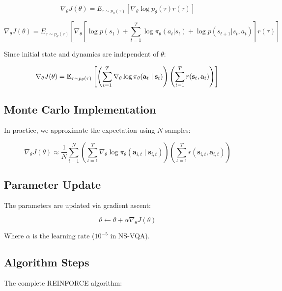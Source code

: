 \documentclass[10pt, oneside]{article}
\begin{document}
\begin{equation}
    \nabla_{\theta} J(\theta) = E_{\tau \sim p_{\theta}(\tau)} \left[ \nabla_{\theta} \log p_{\theta}(\tau) r(\tau) \right]
\end{equation}

\begin{equation}
    \nabla_{\theta} J(\theta) = E_{\tau \sim p_{\theta}(\tau)} \left[ \nabla_{\theta}\left[\log p(s_{1})+\sum_{t=1}^{T}\log \pi_{\theta}(a_{t}|s_{t})+\log p(s_{t+1}|s_{t},a_{t})\right] r(\tau) \right]
\end{equation}

Since initial state and dynamics are independent of $\theta$:

\begin{equation}
    \nabla_{\theta} J(\theta) = \mathbb{E}_{\tau \sim p_{\theta}(\tau)} \left[ \left( \sum_{t=1}^{T} \nabla_{\theta} \log \pi_{\theta}(\mathbf{a}_{t} \mid \mathbf{s}_{t}) \right) \left( \sum_{t=1}^{T} r(\mathbf{s}_{t}, \mathbf{a}_{t}) \right) \right] \\
\end{equation}

\subsection{Monte Carlo Implementation}
In practice, we approximate the expectation using $N$ samples:

\begin{equation}
    \nabla_{\theta} J(\theta) \approx \frac{1}{N} \sum_{i=1}^{N} \left( \sum_{t=1}^{T} \nabla_{\theta} \log \pi_{\theta}(\mathbf{a}_{i,t} \mid \mathbf{s}_{i,t}) \right) \left( \sum_{t=1}^{T} r(\mathbf{s}_{i,t}, \mathbf{a}_{i,t}) \right)
\end{equation}

\subsection{Parameter Update}
The parameters are updated via gradient ascent:

\begin{equation}
    \theta \leftarrow \theta + \alpha \nabla_{\theta} J(\theta)
\end{equation}

Where $\alpha$ is the learning rate ($10^{-5}$ in NS-VQA).

\subsection{Algorithm Steps}
The complete REINFORCE algorithm:
\end{document}

